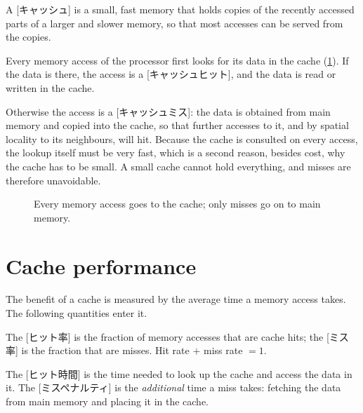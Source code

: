 \documentclass[../main.tex]{subfiles}
\begin{document}
\begin{definition}[Cache]
  A [キャッシュ] is a small, fast memory that holds copies of the
  recently accessed parts of a larger and slower memory, so that most
  accesses can be served from the copies.
\end{definition}

Every memory access of the processor first looks for its data in the cache
(\cref{fig:l12-cache-position}).  If the data is there, the access is a
[キャッシュヒット], and the data is read or written in the
cache.

Otherwise the access is a [キャッシュミス]: the data is
obtained from main memory and copied into the cache, so that further accesses
to it, and by spatial locality to its neighbours, will hit.  Because the
cache is consulted on every access, the lookup itself must be very fast, which
is a second reason, besides cost, why the cache has to be small.  A small
cache cannot hold everything, and misses are therefore
unavoidable.

\begin{figure}[htbp]
  \centering
  
  \caption{Every memory access goes to the cache; only misses go on to main
    memory.}
  \label{fig:l12-cache-position}
\end{figure}

\section{Cache performance}
\label{sec:l12-performance}

The benefit of a cache is measured by the average time a memory access
takes.  The following
quantities enter it.

\begin{definition}
  The [ヒット率] is the fraction of memory accesses that are
  cache hits; the [ミス率] is the fraction that are misses.
  Hit rate $+$ miss rate $= 1$.
\end{definition}

\begin{definition}
  The [ヒット時間] is the time needed to look up the cache and
  access the data in it.  The [ミスペナルティ] is the
  \emph{additional} time a miss takes: fetching the data from main memory
  and placing it in the cache.
\end{definition}
\end{document}

